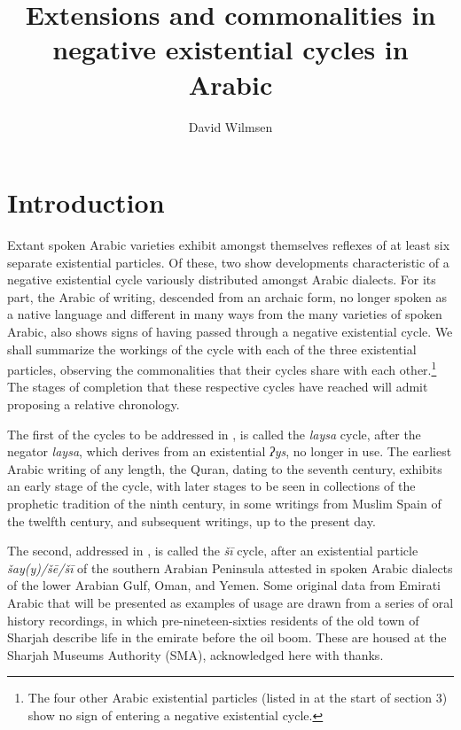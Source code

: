 \documentclass[output=paper]{langsci/langscibook}
\author{David Wilmsen\affiliation{American University of Sharjah}}
\title{Extensions and commonalities in negative existential cycles in Arabic}
\begin{document}
\maketitle

\section{Introduction} \label{s:WiAR-1}

Extant spoken Arabic varieties exhibit amongst themselves reflexes of at least six separate existential particles. Of these, two show developments characteristic of a negative existential cycle \citep{Croft1991} variously distributed amongst Arabic dialects. For its part, the Arabic of writing, descended from an archaic form, no longer spoken as a native language and different in many ways from the many varieties of spoken Arabic, also shows signs of having passed through a negative existential cycle. We shall summarize the workings of the cycle with each of the three existential particles, observing the commonalities that their cycles share with each other.\footnote{The four other Arabic existential particles (listed in  at the start of section 3) show no sign of entering a negative existential cycle.} The stages of completion that these respective cycles have reached will admit proposing a relative chronology.

The first of the cycles to be addressed in , is called the \textit{laysa} cycle, after the negator \textit{laysa}, which derives from an existential \textit{ʔys}, no longer in use. The earliest Arabic writing of any length, the Quran, dating to the seventh century, exhibits an early stage of the cycle, with later stages to be seen in collections of the prophetic tradition of the ninth century, in some writings from Muslim Spain of the twelfth century, and subsequent writings, up to the present day.

The second, addressed in , is called the \textit{šī} cycle, after an existential particle \textit{šay(y)/šē/šī} of the southern Arabian Peninsula attested in spoken Arabic dialects of the lower Arabian Gulf, Oman, and Yemen. Some original data from Emirati Arabic that will be presented as examples of usage are drawn from a series of oral history recordings, in which pre-nineteen-sixties residents of the old town of Sharjah describe life in the emirate before the oil boom. These are housed at the Sharjah Museums Authority (SMA), acknowledged here with thanks.
\end{document}
